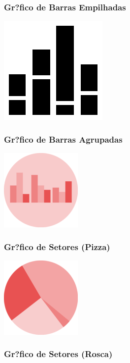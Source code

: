 \documentclass[]{article}
\begin{document}
\hypertarget{grfico-de-barras-empilhadas}{%
\subsubsection{Gr?fico de Barras
Empilhadas}\label{grfico-de-barras-empilhadas}}

\includegraphics{img/stacked_bar_chart.png}

\hypertarget{grfico-de-barras-agrupadas}{%
\subsubsection{Gr?fico de Barras
Agrupadas}\label{grfico-de-barras-agrupadas}}

\includegraphics{img/grouped_bar.png}

\hypertarget{grfico-de-setores-pizza}{%
\subsubsection{Gr?fico de Setores
(Pizza)}\label{grfico-de-setores-pizza}}

\includegraphics{img/pie_chart.png}

\hypertarget{grfico-de-setores-rosca}{%
\subsubsection{Gr?fico de Setores
(Rosca)}\label{grfico-de-setores-rosca}}
\end{document}

